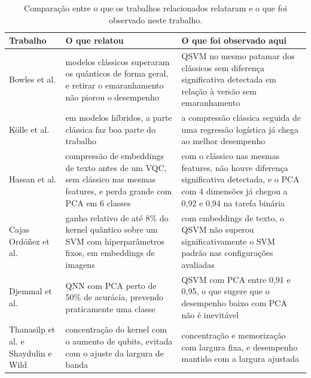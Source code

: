 \documentclass[conference]{IEEEtran}
\begin{document}
\begin{table}[t]
\centering
\caption{Comparação entre o que os trabalhos relacionados relataram e o que foi observado neste trabalho.}
\label{tab:comparacao}
\footnotesize
\begin{tabular}{p{}p{}p{}}
\toprule
Trabalho & O que relatou & O que foi observado aqui \\
\midrule
Bowles et al. \cite{bowles2024} & modelos clássicos superaram os quânticos de forma geral, e retirar o emaranhamento não piorou o desempenho & QSVM no mesmo patamar dos clássicos sem diferença significativa detectada em relação à versão sem emaranhamento \\
Kölle et al. \cite{kolle2024} & em modelos híbridos, a parte clássica faz boa parte do trabalho & a compressão clássica seguida de uma regressão logística já chega ao melhor desempenho \\
Hassan et al. \cite{hassan2026} & compressão de embeddings de texto antes de um VQC, sem clássico nas mesmas features, e perda grande com PCA em 6 classes & com o clássico nas mesmas features, não houve diferença significativa detectada, e o PCA com 4 dimensões já chegou a 0,92 e 0,94 na tarefa binária \\
Cajas Ordóñez et al. \cite{cajas2025} & ganho relativo de até 8\% do kernel quântico sobre um SVM com hiperparâmetros fixos, em embeddings de imagens & com embeddings de texto, o QSVM não superou significativamente o SVM padrão nas configurações avaliadas \\
Djemmal et al. \cite{djemmal2025} & QNN com PCA perto de 50\% de acurácia, prevendo praticamente uma classe & QSVM com PCA entre 0,91 e 0,95, o que sugere que o desempenho baixo com PCA não é inevitável \\
Thanasilp et al. \cite{thanasilp2024} e Shaydulin e Wild \cite{shaydulin2021} & concentração do kernel com o aumento de qubits, evitada com o ajuste da largura de banda & concentração e memorização com largura fixa, e desempenho mantido com a largura ajustada \\
\bottomrule
\end{tabular}
\end{table}
\end{document}
